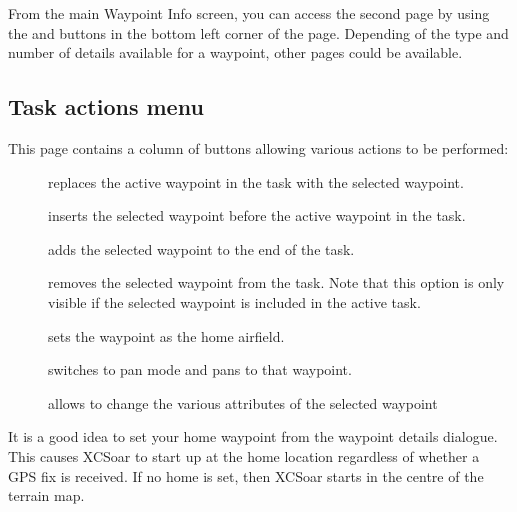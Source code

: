 From the main Waypoint Info screen, you can access the second page by using the 
\bmenuw{$>$} and \bmenuw{$<$} buttons in the bottom left corner of the page.
Depending of the type and number of details available for a waypoint,
other pages could be available.

\subsection*{Task actions menu}  
This page contains a column of buttons allowing various actions to be performed:
\begin{description}
\item[] replaces the active waypoint in the task with 
  the selected waypoint.
\item[] inserts the selected waypoint before the active 
  waypoint in the task.
\item[] adds the selected waypoint to the end of the task.
\item[] removes the selected waypoint from the task.  
  Note that this option is only visible if the selected waypoint is included in 
  the active task.
\item[] sets the waypoint as the home airfield.
\item[] switches to pan mode and pans to that waypoint.
\item[] %
\item[] %
\item[] allows to change the various attributes of the selected waypoint
\end{description}

It is a good idea to set your home waypoint from the waypoint details
dialogue. This causes XCSoar to start up at the home location regardless
of whether a GPS fix is received.  If no home is set, then XCSoar
starts in the centre of the terrain map.

